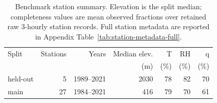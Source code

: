\begin{table}[t]
  \centering
  \caption{Benchmark station summary. Elevation is the split median; completeness values are mean observed fractions over retained raw 3-hourly station records. Full station metadata are reported in Appendix Table~\ref{tab:station-metadata-full}.}
  \label{tab:station-metadata}
  \begin{tabular}{lrrrrrr}
    \toprule
    Split & Stations & Years & Median elev. & T & RH & q \\
    & & & (m) & (\%) & (\%) & (\%) \\
    \midrule
    held-out & 5 & 1989--2021 & 2030 & 78 & 82 & 70 \\
    main & 27 & 1984--2021 & 416 & 79 & 70 & 61 \\
    \bottomrule
  \end{tabular}
\end{table}
